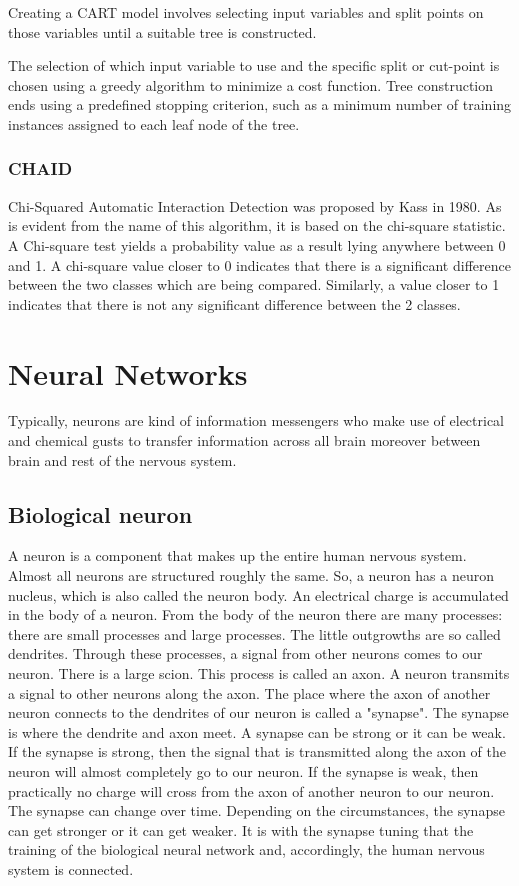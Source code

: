 \documentclass{article}
\begin{document}
Creating a CART model involves selecting input variables and split points on those variables until a suitable tree is constructed.

The selection of which input variable to use and the specific split or cut-point is chosen using a greedy algorithm to minimize a cost function. Tree construction ends using a predefined stopping criterion, such as a minimum number of training instances assigned to each leaf node of the tree.

\subsubsection{CHAID}
Chi-Squared Automatic Interaction Detection was proposed by Kass \cite{Lewis-Beck2012} in 1980. As is evident from the name of this algorithm, it is based on the chi-square statistic. A Chi-square test yields a probability value as a result lying anywhere between 0 and 1. A chi-square value closer to 0 indicates that there is a significant difference between the two classes which are being compared. Similarly, a value closer to 1 indicates that there is not any significant difference between the 2 classes. 



\section{Neural Networks}
Typically, neurons are kind of information messengers who make use of electrical and chemical gusts to transfer information across all brain moreover between brain and rest of the nervous system.

\subsection{Biological neuron}
A neuron is a component that makes up the entire human nervous system. Almost all neurons are structured roughly the same. So, a neuron has a neuron nucleus, which is also called the neuron body. An electrical charge is accumulated in the body of a neuron. From the body of the neuron there are many processes: there are small processes and large processes. The little outgrowths are so called dendrites. Through these processes, a signal from other neurons comes to our neuron. There is a large scion. This process is called an axon. A neuron transmits a signal to other neurons along the axon. The place where the axon of another neuron connects to the dendrites of our neuron is called a "synapse". The synapse is where the dendrite and axon meet. A synapse can be strong or it can be weak. If the synapse is strong, then the signal that is transmitted along the axon of the neuron will almost completely go to our neuron. If the synapse is weak, then practically no charge will cross from the axon of another neuron to our neuron. The synapse can change over time. Depending on the circumstances, the synapse can get stronger or it can get weaker. It is with the synapse tuning that the training of the biological neural network and, accordingly, the human nervous system is connected.
\end{document}
